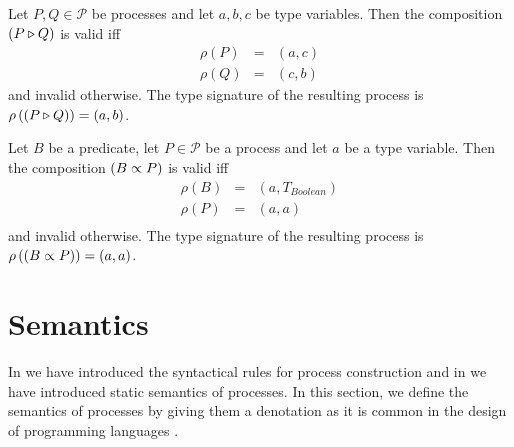 \begin{definition}
\label{def:static_sequence}
Let $P, Q \in \mathcal{P}$ be processes and let $a, b, c$ be type variables. Then the composition $\left( P \triangleright Q \right)$ is valid iff
\begin{eqnarray*}
  \rho \left( P \right) & = & \left( a, c \right) \\
  \rho \left( Q \right) & = & \left( c, b \right)
\end{eqnarray*}
and invalid otherwise. The type signature of the resulting process is $\rho \left( \left( P \triangleright Q \right) \right) = \left( a, b \right)$.

\hfill\qedsymbol
\end{definition}


\begin{definition}
\label{def:static_repetition}
Let $B$ be a predicate, let $P \in \mathcal{P}$ be a process and let $a$ be a type variable. Then the composition $\left( B \propto P \right)$ is valid iff
\begin{eqnarray*}
  \rho \left( B \right) & = & \left( a, T_{Boolean} \right) \\
  \rho \left( P \right) & = & \left( a, a \right) \\
\end{eqnarray*}
and invalid otherwise. The type signature of the resulting process is $\rho \left( \left( B \propto P \right) \right) = \left( a, a \right)$.

\hfill\qedsymbol
\end{definition}




\clearpage
\section{Semantics}
\label{chp:semantics}
In  we have introduced the syntactical rules for process construction and in  we have introduced static semantics of processes. In this section, we define the semantics of processes by giving them a denotation as it is common in the design of programming languages \cite{DenSem}.

